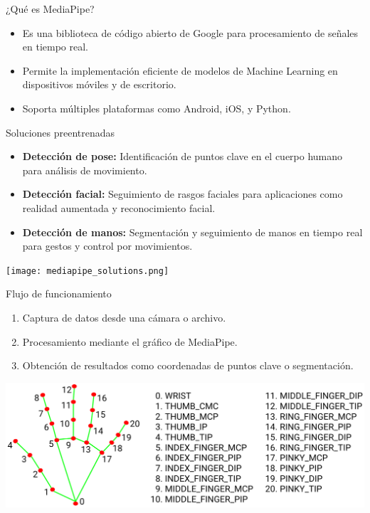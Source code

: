 
\begin{frame}{¿Qué es MediaPipe?}
    \begin{itemize}
        \item Es una biblioteca de código abierto de Google para procesamiento de señales en tiempo real.
        \item Permite la implementación eficiente de modelos de Machine Learning en dispositivos móviles y de escritorio.
        \item Soporta múltiples plataformas como Android, iOS, y Python.
    \end{itemize}
\end{frame}

\begin{frame}{Soluciones preentrenadas}
    \begin{itemize}
        \item \textbf{Detección de pose:} Identificación de puntos clave en el cuerpo humano para análisis de movimiento.
        \item \textbf{Detección facial:} Seguimiento de rasgos faciales para aplicaciones como realidad aumentada y reconocimiento facial.
        \item \textbf{Detección de manos:} Segmentación y seguimiento de manos en tiempo real para gestos y control por movimientos.
    \end{itemize}
    \begin{center}
        \texttt{[image: mediapipe\_solutions.png]}
    \end{center}
\end{frame}

\begin{frame}{Flujo de funcionamiento}
    \begin{enumerate}
        \item Captura de datos desde una cámara o archivo.
        \item Procesamiento mediante el gráfico de MediaPipe.
        \item Obtención de resultados como coordenadas de puntos clave o segmentación.
    \end{enumerate}
    \begin{center}
        \includegraphics[width=0.6\linewidth]{01_MediaPipe/hand_landmarks.png}
    \end{center}
\end{frame}

